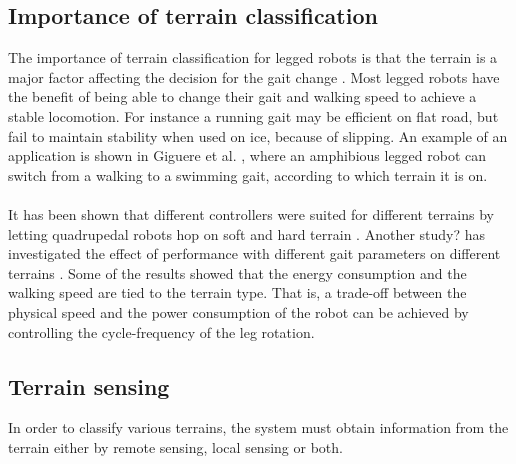 \documentclass[USenglish]{ifimaster}  %
\begin{document}
\subsection{Importance of terrain classification}
The importance of terrain classification for legged robots is that the terrain is a major factor affecting the decision for the gait change \cite{6569179}. Most legged robots have the benefit of being able to change their gait and walking speed to achieve a stable locomotion. For instance a running gait may be efficient on flat road, but fail to maintain stability when used on ice, because of slipping. An example of an application is shown in Giguere et al. \cite{Giguere06environmentidentification}, where an amphibious legged robot can switch from a walking to a swimming gait, according to which terrain it is on. 
\\
\\
It has been shown that different controllers were suited for different terrains by letting quadrupedal robots hop on soft and hard terrain \cite{7487541}. Another study? has investigated the effect of performance with different gait parameters on different terrains \cite{6569179}. Some of the results showed that the energy consumption and the walking speed are tied to the terrain type. That is, a trade-off between the physical speed and the power consumption of the robot can be achieved by controlling the cycle-frequency of the leg rotation.
	
	
\subsection{Terrain sensing}
In order to classify various terrains, the system must obtain information from the terrain either by remote sensing, local sensing or both.
	
\end{document}
